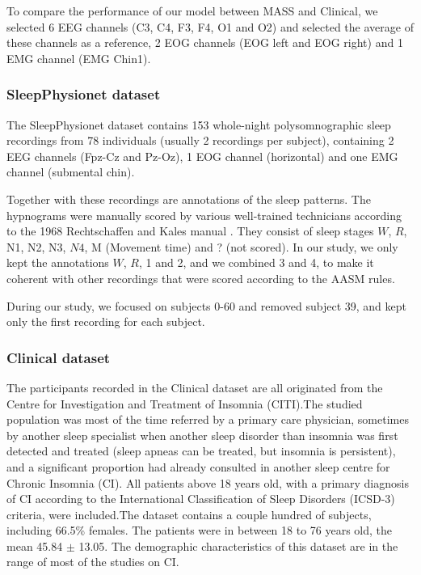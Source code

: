 \documentclass[titlepage, 11pt, a4paper, fancysections]{article}
\begin{document}
To compare the performance of our model between MASS and Clinical, we selected 6 EEG channels (C3, C4, F3, F4, O1 and O2) and selected the average of these channels as a reference, 2 EOG channels (EOG left and EOG right) and 1 EMG channel (EMG Chin1). 

\subsubsection{SleepPhysionet dataset}
The SleepPhysionet dataset \autocite{SleepPhysionet1, SleepPhysionet2} contains 153 whole-night polysomnographic sleep recordings from 78 individuals (usually 2 recordings per subject), containing 2 EEG channels (Fpz-Cz and Pz-Oz), 1 EOG channel (horizontal) and one EMG channel (submental chin). 

Together with these recordings are annotations of the sleep patterns. The hypnograms were manually scored by various well-trained technicians according to the 1968 Rechtschaffen and Kales manual \autocite{rkmanual}. They consist of sleep stages $W$, $R$, N1, N2, N3, $N4$, M (Movement time) and ? (not scored). In our study, we only kept the annotations $W$, $R$, 1 and 2, and we combined 3 and 4, to make it coherent with other recordings that were scored according to the AASM rules. 

During our study, we focused on subjects 0-60 and removed subject 39, and kept only the first recording for each subject.

\subsubsection{Clinical dataset}

The participants recorded in the Clinical dataset are all originated from the Centre for Investigation and Treatment of Insomnia (CITI).The studied population was most of the time referred by a primary care physician, sometimes by another sleep specialist when another sleep disorder than insomnia was first detected and treated (sleep apneas can be treated, but insomnia is persistent), and a significant proportion had already consulted in another sleep centre for Chronic Insomnia (CI). All patients above 18 years old, with a primary diagnosis of CI according to the International Classification of Sleep Disorders (ICSD-3) criteria, were included.The dataset contains a couple hundred of subjects, including 66.5\% females. The patients were in between 18 to 76 years old, the mean 45.84 $\pm$ 13.05. The demographic characteristics of this dataset are in the range of most of the studies on CI.
\end{document}
